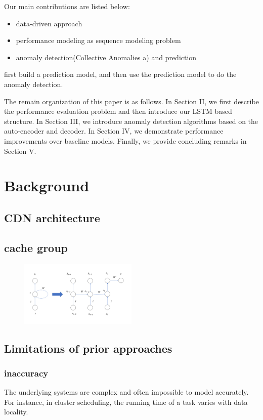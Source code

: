 \documentclass[review]{elsarticle}
\begin{document}
Our main contributions are listed below:
\begin{itemize}
  \item data-driven approach
  \item performance modeling as sequence modeling problem
  \item anomaly detection(Collective Anomalies a) and prediction
\end{itemize}

first build a prediction model, and then use the prediction model to do the anomaly detection.

The remain organization of this paper is as follows. In Section II, we 
first  describe  the performance evaluation problem
and  then  introduce  our  LSTM  based  structure.  In  Section
III, we introduce anomaly detection algorithms based on the
auto-encoder and decoder. In  Section  IV,  we  demonstrate
performance  improvements  over baseline models. 
Finally, we provide concluding remarks in Section V.
\section{Background}
\subsection{CDN architecture}
\subsection{cache group}
\begin{figure}[h]
    \centering
    \includegraphics[width=0.5\textwidth]{RNN.png}
    \caption{}
    \label{fig:RNN}
\end{figure}
\subsection{Limitations of prior approaches}
\subsubsection{inaccuracy}
  The underlying systems are complex and often impossible to model accurately. For instance, in cluster scheduling, the running time of a task varies with data locality.
\end{document}
